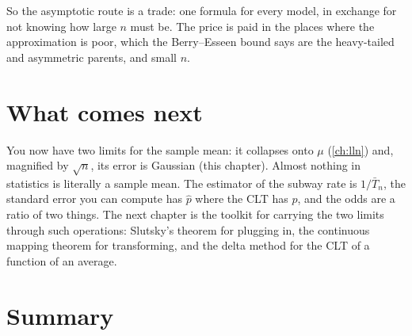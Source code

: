 So the asymptotic route is a trade: one formula for every model, in exchange for not knowing how large $n$ must be.
The price is paid in the places where the approximation is poor, which the Berry--Esseen bound says are the heavy-tailed and asymmetric parents, and small $n$.

\section{What comes next}
\label{sec:clt-next}

You now have two limits for the sample mean: it collapses onto $\mu$ (\cref{ch:lln}) and, magnified by $\sqrt{n}$, its error is Gaussian (this chapter).
Almost nothing in statistics is literally a sample mean.
The estimator of the subway rate is $1/\bar{T}_n$, the standard error you can compute has $\hat{p}$ where the CLT has $p$, and the odds are a ratio of two things.
The next chapter is the toolkit for carrying the two limits through such operations: Slutsky's theorem for plugging in, the continuous mapping theorem for transforming, and the delta method for the CLT of a function of an average.

\section{Summary}
\label{sec:clt-summary}

